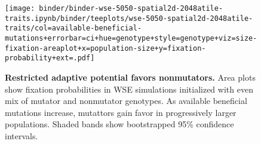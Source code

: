 \begin{figure}

\centering
\texttt{[image: binder/binder-wse-5050-spatial2d-2048atile-traits.ipynb/binder/teeplots/wse-5050-spatial2d-2048atile-traits/col=available-beneficial-mutations+errorbar=ci+hue=genotype+style=genotype+viz=size-fixation-areaplot+x=population-size+y=fixation-probability+ext=.pdf]}%
\vspace{-3ex}
\caption{
\textbf{Restricted adaptive potential favors nonmutators.}
\footnotesize
Area plots show fixation probabilities in WSE simulations initialized with even mix of mutator and nonmutator genotypes.
As available beneficial mutations increase, mutattors gain favor in progressively larger populations.
Shaded bands show bootstrapped 95\% confidence intervals.
}
\label{fig:avail-ben-muts}

\vspace{-3ex}

\end{figure}
